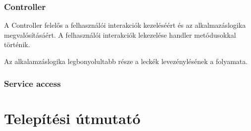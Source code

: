 \documentclass[11pt, a4paper]{article}
\begin{document}
     \subsubsection{Controller}
     A Controller felelős a felhasználói interakciók kezeléséért és az alkalmazáslogika megvalósításáért. A felhasználói interakciók lekezelése handler metódusokkal történik.
     
     Az alkalamzáslogika legbonyolultabb része a leckék levezénylésének a folyamata.
     \subsubsection{Service access}
     
    \section{Telepítési útmutató}
    
    
\end{document}
